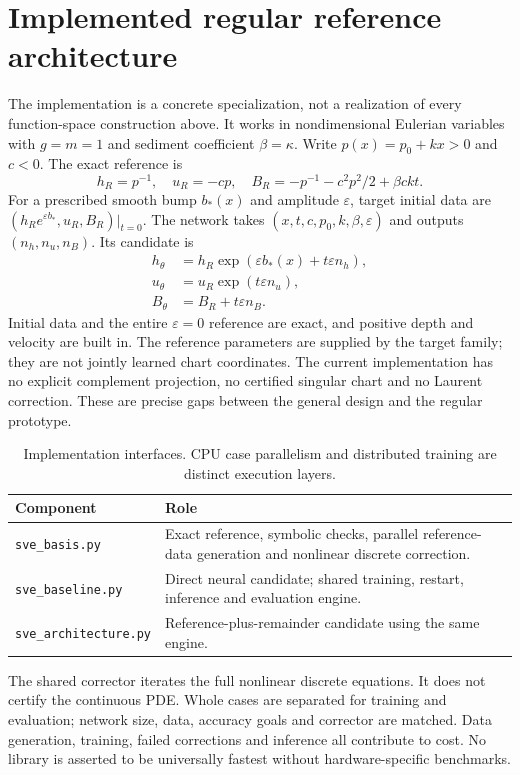 \documentclass[12pt,a4paper,oneside]{report}
\numberwithin{equation}{chapter}
\theoremstyle{remark}\newtheorem{remark}[theorem]{Remark}
\DeclareRobustCommand{\code}[1]{\nolinkurl{#1}}
\begin{document}
\section{Implemented regular reference architecture}
The implementation is a concrete specialization, not a realization of every function-space construction above. It works in nondimensional Eulerian variables with $g=m=1$ and sediment coefficient $\beta=\kappa$. Write $p(x)=p_0+kx>0$ and $c<0$. The exact reference is
\[
 h_R=p^{-1},\quad u_R=-cp,\quad
 B_R=-p^{-1}-c^2p^2/2+\beta ckt.
\]
For a prescribed smooth bump $b_*(x)$ and amplitude $\varepsilon$, target initial data are $(h_Re^{\varepsilon b_*},u_R,B_R)|_{t=0}$. The network takes $(x,t,c,p_0,k,\beta,\varepsilon)$ and outputs $(n_h,n_u,n_B)$. Its candidate is
\begin{align*}
 h_\theta&=h_R\exp(\varepsilon b_*(x)+t\varepsilon n_h),\\
 u_\theta&=u_R\exp(t\varepsilon n_u),\\
 B_\theta&=B_R+t\varepsilon n_B.
\end{align*}
Initial data and the entire $\varepsilon=0$ reference are exact, and positive depth and velocity are built in. The reference parameters are supplied by the target family; they are not jointly learned chart coordinates. The current implementation has no explicit complement projection, no certified singular chart and no Laurent correction. These are precise gaps between the general design and the regular prototype.

\begin{table}[htbp]\centering\small
\begin{tabularx}{\linewidth}{@{}lX@{}}\toprule
Component & Role\\\midrule
\code{sve_basis.py} & Exact reference, symbolic checks, parallel reference-data generation and nonlinear discrete correction.\\
\code{sve_baseline.py} & Direct neural candidate; shared training, restart, inference and evaluation engine.\\
\code{sve_architecture.py} & Reference-plus-remainder candidate using the same engine.\\\bottomrule
\end{tabularx}
\caption[Implementation interfaces]{Implementation interfaces. CPU case parallelism and distributed training are distinct execution layers.}
\end{table}
The shared corrector iterates the full nonlinear discrete equations. It does not certify the continuous PDE. Whole cases are separated for training and evaluation; network size, data, accuracy goals and corrector are matched. Data generation, training, failed corrections and inference all contribute to cost. No library is asserted to be universally fastest without hardware-specific benchmarks.
\end{document}
